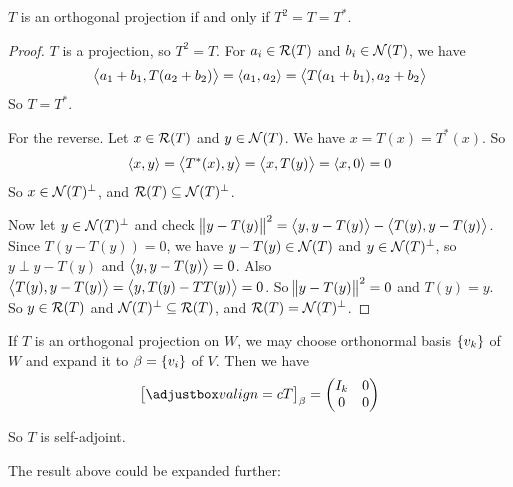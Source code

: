 \begin{theorem}
    $T$ is an orthogonal projection if and only if $T^2 = T = T^*$.
\end{theorem}
\begin{proof}
    $T$ is a projection, so $T^2 = T$. For $a_i \in \mathcal{R}(T)$ and $b_i \in \mathcal{N}(T)$, we have 
    \begin{equation*}
        \left\langle \displaystyle a_1 + b_1, T(a_2 + b_2) \right\rangle = \left\langle \displaystyle a_1, a_2 \right\rangle = \left\langle \displaystyle T(a_1 + b_1), a_2 + b_2 \right\rangle
    \end{equation*}
    So $T = T^*$.
    
    For the reverse. Let $x \in \mathcal{R}(T)$ and $y \in \mathcal{N}(T)$. We have $x = T(x) = T^*(x)$. So
    \begin{equation*}
        \left\langle \displaystyle x, y \right\rangle = \left\langle \displaystyle T^*(x), y \right\rangle = \left\langle \displaystyle x, T(y) \right\rangle = \left\langle \displaystyle x, 0 \right\rangle = 0
    \end{equation*}
    So $x \in \mathcal{N}(T)^\perp$, and $\mathcal{R}(T) \subseteq \mathcal{N}(T)^\perp$.
    
    Now let $y \in \mathcal{N}(T)^\perp$ and check $\norm{y - T(y)}^2 = \left\langle \displaystyle y, y - T(y) \right\rangle - \left\langle \displaystyle T(y), y - T(y) \right\rangle$. Since $T(y - T(y)) = 0$, we have $y - T(y) \in \mathcal{N}(T)$ and $y \in \mathcal{N}(T)^\perp$, so $y \perp y - T(y)$ and $\left\langle \displaystyle y, y - T(y) \right\rangle = 0$. Also $\left\langle \displaystyle T(y), y - T(y) \right\rangle = \left\langle \displaystyle y, T(y) - TT(y) \right\rangle = 0$. So $\norm{y - T(y)}^2 = 0$ and $T(y) = y$. So $y \in \mathcal{R}(T)$ and $\mathcal{N}(T)^\perp \subseteq \mathcal{R}(T)$, and $\mathcal{R}(T) = \mathcal{N}(T)^\perp$.
\end{proof}

If $T$ is an orthogonal projection on $W$, we may choose orthonormal basis $\set{v_k}$ of $W$ and expand it to $\beta = \set{v_i}$ of $V$. Then we have
\begin{equation}
    \coordinate{T}_\beta = \begin{pmatrix}
        I_k & 0 \\
        0 & 0
    \end{pmatrix}
\end{equation}

So $T$ is self-adjoint.

The result above could be expanded further:

